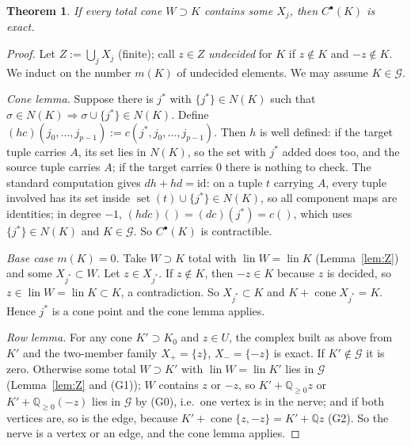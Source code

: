 \documentclass[11pt]{article}
\newtheorem{theorem}{Theorem}[section]
\theoremstyle{definition}
\theoremstyle{remark}
\newcommand{\QQ}{\mathbb{Q}}
\newcommand{\lin}{\operatorname{lin}}
\newcommand{\cone}{\operatorname{cone}}
\newcommand{\cG}{\mathcal{G}}
\newcommand{\set}{\operatorname{set}}
\begin{document}
\begin{theorem}\label{thm:T}
If every total cone $W\supset K$ contains some $X_j$, then $C^\bullet(K)$ is exact.
\end{theorem}
\begin{proof}
Let $Z:=\bigcup_jX_j$ (finite); call $z\in Z$ \emph{undecided} for $K$ if $z\notin K$ and $-z\notin K$. We induct on the number $m(K)$ of undecided elements. We may assume $K\in\cG$.

\emph{Cone lemma.} Suppose there is $j^*$ with $\{j^*\}\in N(K)$ such that $\sigma\in N(K)\Rightarrow\sigma\cup\{j^*\}\in N(K)$. Define $(hc)(j_0,\dots,j_{p-1}):=c(j^*,j_0,\dots,j_{p-1})$. Then $h$ is well defined: if the target tuple carries $A$, its set lies in $N(K)$, so the set with $j^*$ added does too, and the source tuple carries $A$; if the target carries $0$ there is nothing to check. The standard computation gives $dh+hd=\mathrm{id}$: on a tuple $t$ carrying $A$, every tuple involved has its set inside $\set(t)\cup\{j^*\}\in N(K)$, so all component maps are identities; in degree $-1$, $(hdc)()=(dc)(j^*)=c()$, which uses $\{j^*\}\in N(K)$ and $K\in\cG$. So $C^\bullet(K)$ is contractible.

\emph{Base case $m(K)=0$.} Take $W\supset K$ total with $\lin W=\lin K$ (Lemma~\ref{lem:Z}) and some $X_{j^*}\subset W$. Let $z\in X_{j^*}$. If $z\notin K$, then $-z\in K$ because $z$ is decided, so $z\in\lin W=\lin K\subset K$, a contradiction. So $X_{j^*}\subset K$ and $K+\cone X_{j^*}=K$. Hence $j^*$ is a cone point and the cone lemma applies.

\emph{Row lemma.} For any cone $K'\supset K_0$ and $z\in U$, the complex built as above from $K'$ and the two-member family $X_+=\{z\}$, $X_-=\{-z\}$ is exact. If $K'\notin\cG$ it is zero. Otherwise some total $W\supset K'$ with $\lin W=\lin K'$ lies in $\cG$ (Lemma~\ref{lem:Z} and (G1)); $W$ contains $z$ or $-z$, so $K'+\QQ_{\ge0}z$ or $K'+\QQ_{\ge0}(-z)$ lies in $\cG$ by (G0), i.e.\ one vertex is in the nerve; and if both vertices are, so is the edge, because $K'+\cone\{z,-z\}=K'+\QQ z$ (G2). So the nerve is a vertex or an edge, and the cone lemma applies.


\end{proof}
\end{document}
